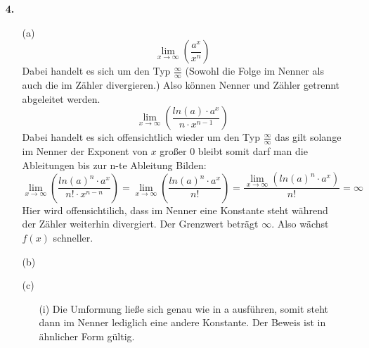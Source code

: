 \documentclass[a4paper,11pt,fleqn]{scrartcl}
\newcommand{\bra}[1]{\left(#1\right)}
\newcommand{\limx}[1]{\lim\limits_{x \rightarrow \infty}\bra{#1}}
\begin{document}
\begin{enumerate}
\begin{enumerate}
        \end{enumerate}
    \item[\textbf{4.}]
        \begin{enumerate}
            \item[(a)]
                \[ \limx{ \frac{a^x}{x^n} }\] Dabei handelt es sich um den Typ $\frac{\infty}{\infty}$ (Sowohl die Folge im Nenner als auch die im Zähler divergieren.)
                Also können Nenner und Zähler getrennt abgeleitet werden. 
                \[\limx{\frac{ln(a) \cdot a^x}{n \cdot x^{n-1}}}\] Dabei handelt es sich offensichtlich wieder um den Typ $\frac{\infty}{\infty}$ das gilt solange im Nenner der Exponent von $x$ großer 0 bleibt somit darf man die Ableitungen bis zur n-te Ableitung Bilden:
                \[\limx{\frac{ln(a)^n \cdot a^x}{n! \cdot x^{n-n}}} = \limx{\frac{ln(a)^n \cdot a^x}{n!}} = \frac{\limx{ln(a)^n \cdot a^x}}{n!} = \infty\]
                Hier wird offensichtilich, dass im Nenner eine Konstante steht während der Zähler weiterhin divergiert. Der Grenzwert beträgt $\infty$. Also wächst $f(x)$ schneller.
            \item[(b)]
            \item[(c)]
                \begin{enumerate}
                \item[(i)]
                Die Umformung ließe sich genau wie in a ausführen, somit steht dann im Nenner lediglich eine andere Konstante. Der Beweis ist in ähnlicher Form gültig.
                \end{enumerate}
        \end{enumerate}
\end{enumerate}
\end{document}
